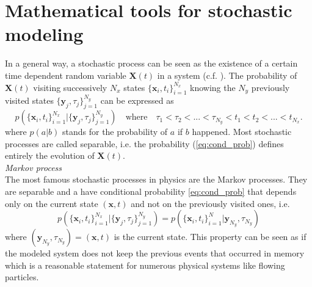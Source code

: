 \section{Mathematical tools for stochastic modeling}
In a general way, a stochastic process can be seen as the existence of a certain time dependent random variable $\textbf{X}(t)$ in a system (c.f. \citet[Sec. 3.1]{Gardiner1996}). The probability of $\textbf{X}(t)$ visiting successively $N_x$ states $\{\textbf{x}_i,t_i\}_{i=1}^{N_x}$ knowing the $N_y$ previously visited states $\{\textbf{y}_j,\tau_j\}_{j=1}^{N_y}$  can be expressed as
\begin{equation}\label{eq:cond_prob}
p(\{\textbf{x}_i,t_i\}_{i=1}^{N_x}|\{\textbf{y}_j,\tau_j\}_{j=1}^{N_y})\quad\textrm{where}\quad \tau_1<\tau_2<...<\tau_{N_y}<t_1<t_2<...<t_{N_x}.
\end{equation}
where $p(a|b)$ stands for the probability of $a$ if $b$ happened.
Most stochastic processes are called separable, i.e. the probability (\ref{eq:cond_prob}) defines entirely the evolution of $\textbf{X}(t)$.\\
\textit{Markov process}\\
The most famous stochastic processes in physics are the Markov processes. They are separable and a have conditional probability \eqref{eq:cond_prob} that depends only on the current state $(\textbf{x},t)$ and not on the previously visited ones, i.e. 
\[
p(\{\textbf{x}_i,t_i\}_{i=1}^{N_x}|\{\textbf{y}_j,\tau_j\}_{j=1}^{N_y})=p(\{\textbf{x}_i,t_i\}_{i=1}^N|\textbf{y}_{N_y},\tau_{N_y})
\]
where $(\textbf{y}_{N_y},\tau_{N_y})=(\textbf{x},t)$ is the current state.
This property can be seen as if the modeled system does not keep the previous events that occurred in memory which is a reasonable statement for numerous physical systems like flowing particles.\\
